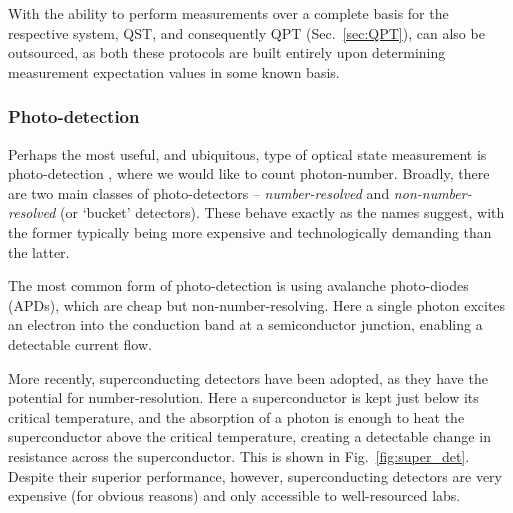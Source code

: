 \documentclass[aps, rmp, twocolumn, amsmath, amssymb, nofootinbib, superscriptaddress, longbibliography, floatfix, table-of-contents, eqsecnum]{revtex4-1}
\begin{document}
With the ability to perform measurements over a complete basis for the respective system, QST, and consequently QPT (Sec.~\ref{sec:QPT}), can also be outsourced, as both these protocols are built entirely upon determining measurement expectation values in some known basis.

%
%

\subsubsection{Photo-detection} \label{sec:photo_detection} 

Perhaps the most useful, and ubiquitous, type of optical state measurement is photo-detection \cite{RohdePDReview}, where we would like to count photon-number. Broadly, there are two main classes of photo-detectors -- \textit{number-resolved} and \textit{non-number-resolved} (or `bucket' detectors). These behave exactly as the names suggest, with the former typically being more expensive and technologically demanding than the latter.

The most common form of photo-detection is using avalanche photo-diodes (APDs), which are cheap but non-number-resolving. Here a single photon excites an electron into the conduction band at a semiconductor junction, enabling a detectable current flow.

More recently, superconducting detectors have been adopted, as they have the potential for number-resolution. Here a superconductor is kept just below its critical temperature, and the absorption of a photon is enough to heat the superconductor above the critical temperature, creating a detectable change in resistance across the superconductor. This is shown in Fig.~\ref{fig:super_det}. Despite their superior performance, however, superconducting detectors are very expensive (for obvious reasons) and only accessible to well-resourced labs.
\end{document}
